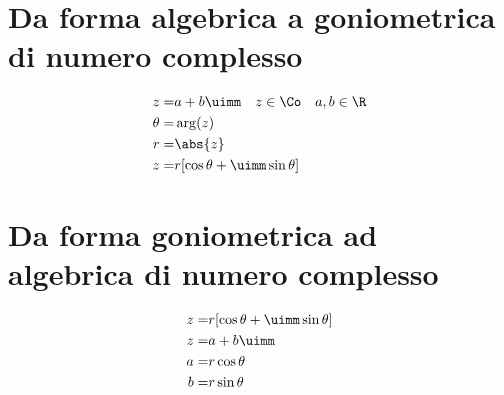 \section{Da forma algebrica a goniometrica di numero complesso}
\begin{align*}
z=&a+b\uimm\quad z\in\Co\quad a,b\in\R\\
\theta=&\arg(z)\\
r=&\abs{z}\\
z=&r[\cos\theta+\uimm\sin\theta]
\end{align*}
\section{Da forma goniometrica ad algebrica di numero complesso}
\begin{align*}
z=&r[\cos\theta+\uimm\sin\theta]\\
z=&a+b\uimm	\\
a=&r\cos\theta\\
b=&r\sin\theta
\end{align*}
